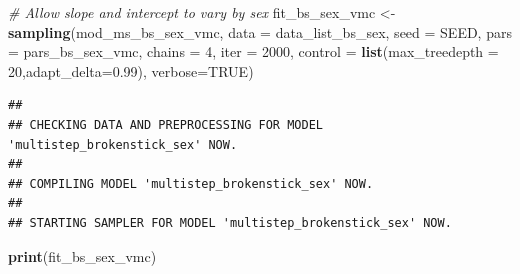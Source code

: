 \documentclass[
]{article}
\newenvironment{Shaded}{\begin{snugshade}}{\end{snugshade}}
\newcommand{\CommentTok}[1]{\textcolor[rgb]{0.56,0.35,0.01}{\textit{#1}}}
\newcommand{\DataTypeTok}[1]{\textcolor[rgb]{0.13,0.29,0.53}{#1}}
\newcommand{\DecValTok}[1]{\textcolor[rgb]{0.00,0.00,0.81}{#1}}
\newcommand{\FloatTok}[1]{\textcolor[rgb]{0.00,0.00,0.81}{#1}}
\newcommand{\KeywordTok}[1]{\textcolor[rgb]{0.13,0.29,0.53}{\textbf{#1}}}
\newcommand{\NormalTok}[1]{#1}
\newcommand{\OtherTok}[1]{\textcolor[rgb]{0.56,0.35,0.01}{#1}}
\newcommand{\StringTok}[1]{\textcolor[rgb]{0.31,0.60,0.02}{#1}}
\begin{document}
\begin{Shaded}
\begin{Highlighting}[]
\CommentTok{# Allow slope and intercept to vary by sex}
\NormalTok{fit_bs_sex_vmc <-}\StringTok{ }\KeywordTok{sampling}\NormalTok{(mod_ms_bs_sex_vmc, }\DataTypeTok{data =}\NormalTok{ data_list_bs_sex, }
                  \DataTypeTok{seed =}\NormalTok{ SEED,}
                  \DataTypeTok{pars =}\NormalTok{ pars_bs_sex_vmc, }\DataTypeTok{chains =} \DecValTok{4}\NormalTok{, }\DataTypeTok{iter =} \DecValTok{2000}\NormalTok{,}
                  \DataTypeTok{control =} \KeywordTok{list}\NormalTok{(}\DataTypeTok{max_treedepth =} \DecValTok{20}\NormalTok{,}\DataTypeTok{adapt_delta=}\FloatTok{0.99}\NormalTok{),}
                  \DataTypeTok{verbose=}\OtherTok{TRUE}\NormalTok{)}
\end{Highlighting}
\end{Shaded}

\begin{verbatim}
## 
## CHECKING DATA AND PREPROCESSING FOR MODEL 'multistep_brokenstick_sex' NOW.
## 
## COMPILING MODEL 'multistep_brokenstick_sex' NOW.
## 
## STARTING SAMPLER FOR MODEL 'multistep_brokenstick_sex' NOW.
\end{verbatim}

\begin{Shaded}
\begin{Highlighting}[]
\KeywordTok{print}\NormalTok{(fit_bs_sex_vmc)}
\end{Highlighting}
\end{Shaded}
\end{document}
